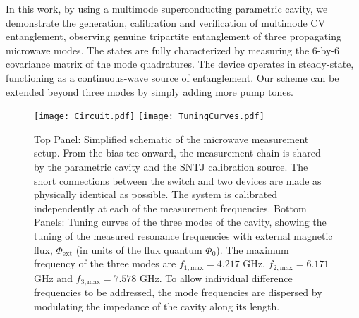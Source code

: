 \documentclass[prl,10pt,twocolumn,superscriptaddress,notitlepage,floatfix,amssymb]{revtex4}
\begin{document}
In this work, by using a multimode superconducting parametric cavity, we demonstrate the generation, calibration and verification of multimode CV entanglement, observing genuine tripartite entanglement of three propagating microwave modes. The states are fully characterized by measuring the 6-by-6 covariance matrix of the mode quadratures. The device operates in steady-state, functioning as a continuous-wave source of entanglement. Our scheme can be extended beyond three modes by simply adding more pump tones.
 

\begin{figure}
\texttt{[image: Circuit.pdf]}	
\texttt{[image: TuningCurves.pdf]}	
\label{Circuit}
\caption{Top Panel: Simplified schematic of the microwave measurement setup. From the bias tee onward, the measurement chain is shared by the parametric cavity and the SNTJ calibration source. The short connections between the switch and two devices are made as physically identical as possible. The system is calibrated independently at each of the measurement frequencies. Bottom Panels: Tuning curves of the three modes of the cavity, showing the tuning of the measured resonance frequencies with external magnetic flux, $\Phi_{\text{ext}}$ (in units of the flux quantum $\Phi_0$). The maximum frequency of the three modes are $f_{1,\text{max}} = 4.217$ GHz, $f_{2,\text{max}} = 6.171$ GHz and $f_{3,\text{max}} = 7.578$ GHz.  To allow individual difference frequencies to be addressed, the mode frequencies are dispersed by modulating the impedance of the cavity along its length.}
\end{figure}
\end{document}
